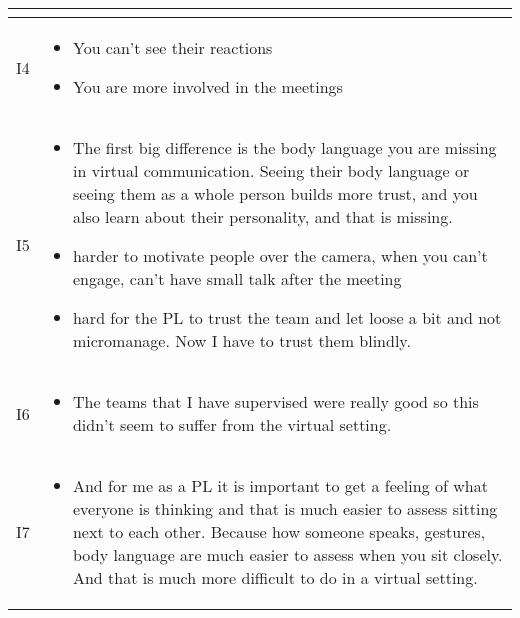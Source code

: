 \begin{longtable}{|  p{}  |  p{} |}
\begin{itemize}
    \end{itemize} \\
\hline
\vspace{-0.5cm} I4 & 
    \begin{itemize}
    \vspace{-0.5cm} \item You can’t see their reactions
    \vspace{-0.3cm} \item You are more involved in the meetings
    \end{itemize}
  \\
\hline
\vspace{-0.5cm} I5 & 
    \begin{itemize}
    \vspace{-0.5cm} \item The first big difference is the body language you are missing in virtual communication. Seeing their body language or seeing them as a whole person builds more trust, and you also learn about their personality, and that is missing.
   \vspace{-0.3cm}  \item harder to motivate people over the camera, when you can't engage, can't have small talk after the meeting
   \vspace{-0.3cm}  \item hard for the PL to trust the team and let loose a bit and not micromanage. Now I have to trust them blindly.
    \end{itemize}
\\
\hline
\vspace{-0.5cm} I6 & 
    \begin{itemize}
   	\vspace{-0.5cm} \item The teams that I have supervised were really good so this didn't seem to suffer from the virtual setting.
    \end{itemize}
   \\
\hline
\vspace{-0.5cm} I7 & 
    \begin{itemize}
    \vspace{-0.5cm} \item And for me as a PL it is important to get a feeling of what everyone is thinking and that is much easier to assess sitting next to each other. Because how someone speaks, gestures, body language are much easier to assess when you sit closely. And that is much more difficult to do in a virtual setting. 
    \end{itemize}

\end{longtable}
